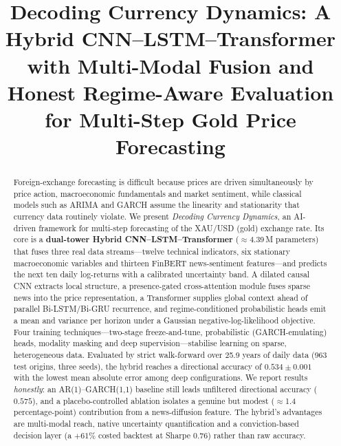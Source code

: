 \documentclass[conference]{IEEEtran}
\begin{document}
\title{Decoding Currency Dynamics: A Hybrid CNN--LSTM--Transformer with Multi-Modal
Fusion and Honest Regime-Aware Evaluation for Multi-Step Gold Price Forecasting}

\author{
}

\maketitle

\begin{abstract}
Foreign-exchange forecasting is difficult because prices are driven simultaneously by
price action, macroeconomic fundamentals and market sentiment, while classical models such
as ARIMA and GARCH assume the linearity and stationarity that currency data routinely
violate. We present \emph{Decoding Currency Dynamics}, an AI-driven framework for
multi-step forecasting of the XAU/USD (gold) exchange rate. Its core is a
\textbf{dual-tower Hybrid CNN--LSTM--Transformer} ($\approx$4.39\,M parameters) that fuses
three real data streams---twelve technical indicators, six stationary macroeconomic
variables and thirteen FinBERT news-sentiment features---and predicts the next ten daily
log-returns with a calibrated uncertainty band. A dilated causal CNN extracts local
structure, a presence-gated cross-attention module fuses sparse news into the price
representation, a Transformer supplies global context ahead of parallel Bi-LSTM/Bi-GRU
recurrence, and regime-conditioned probabilistic heads emit a mean and variance per horizon
under a Gaussian negative-log-likelihood objective. Four training techniques---two-stage
freeze-and-tune, probabilistic (GARCH-emulating) heads, modality masking and deep
supervision---stabilise learning on sparse, heterogeneous data. Evaluated by strict
walk-forward over 25.9 years of daily data (963 test origins, three seeds), the hybrid
reaches a directional accuracy of $0.534 \pm 0.001$ with the lowest mean absolute error
among deep configurations. We report results \emph{honestly}: an AR(1)--GARCH(1,1) baseline
still leads unfiltered directional accuracy ($0.575$), and a placebo-controlled ablation
isolates a genuine but modest ($\approx$1.4 percentage-point) contribution from a
news-diffusion feature. The hybrid's advantages are multi-modal reach, native uncertainty
quantification and a conviction-based decision layer (a $+61\%$ costed backtest at
Sharpe $0.76$) rather than raw accuracy.
\end{abstract}
\end{document}
